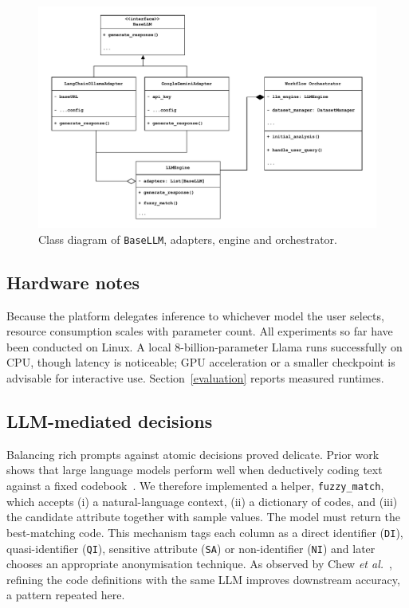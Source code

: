 \documentclass{article}
\begin{document}
\begin{figure}[h]
    \centering
    \includegraphics[width=0.85\linewidth]{images/class_diagram.pdf}
    \caption{Class diagram of \texttt{BaseLLM}, adapters, engine and orchestrator.}
    \label{fig:class-diagram}
\end{figure}

\subsection{Hardware notes}

Because the platform delegates inference to whichever model the user selects, resource consumption scales with parameter count.  All experiments so far have been conducted on Linux.  A local 8-billion-parameter Llama runs successfully on CPU, though latency is noticeable; GPU acceleration or a smaller checkpoint is advisable for interactive use.  Section~\ref{evaluation} reports measured runtimes.

\subsection{LLM-mediated decisions}

Balancing rich prompts against atomic decisions proved delicate.  Prior work shows that large language models perform well when deductively coding text against a fixed codebook~\cite{llm_content_analysis}.  We therefore implemented a helper, \texttt{fuzzy\_match}, which accepts (i) a natural-language context, (ii) a dictionary of codes, and (iii) the candidate attribute together with sample values.  The model must return the best-matching code.  This mechanism tags each column as a direct identifier (\texttt{DI}), quasi-identifier (\texttt{QI}), sensitive attribute (\texttt{SA}) or non-identifier (\texttt{NI}) and later chooses an appropriate anonymisation technique.  As observed by Chew \textit{et al.}~\cite{llm_content_analysis}, refining the code definitions with the same LLM improves downstream accuracy, a pattern repeated here.
\end{document}
